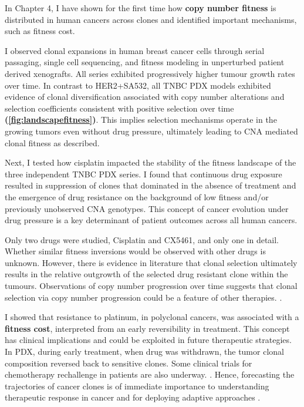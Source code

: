 In Chapter 4, I have shown for the first time how \textbf{copy number fitness} is distributed in human cancers across clones and identified important mechanisms, such as fitness cost. 

I observed clonal expansions in human breast cancer cells through serial passaging, single cell sequencing, and fitness modeling in unperturbed patient derived xenografts. 
All series exhibited progressively higher tumour growth rates over time. In contrast to HER2+SA532, all TNBC PDX models exhibited evidence of clonal diversification associated with copy number alterations and selection coefficients consistent with positive selection over time \textbf{(\autoref{fig:landscapefitness})}. This implies selection mechanisms operate in the growing tumors even without drug pressure, ultimately leading to CNA mediated clonal fitness as described. 

Next, I tested how cisplatin impacted the stability of the fitness landscape of the three independent TNBC PDX series. 
I found that continuous drug exposure resulted in suppression of clones that dominated in the absence of treatment and the emergence of drug resistance on the background of low fitness and/or previously unobserved CNA genotypes. This concept of cancer evolution under drug pressure is a key determinant of patient outcomes across all human cancers. 
 
Only two drugs were studied, Cisplatin and CX5461, and only one in detail. Whether similar fitness inversions would be observed with other drugs is unknown.  
However, there is evidence in literature that clonal selection ultimately results in the relative outgrowth of the selected drug resistant clone within the tumours. Observations of copy number progression over time suggests that clonal selection via copy number progression could be a feature of other therapies. \cite{aparicio2013implications, graham2017measuring, wu2012clonal, liu2009copy}. 

I showed that resistance to platinum, in polyclonal cancers, was associated with a \textbf{fitness cost}, interpreted from an early reversibility in treatment. This concept has clinical implications and could be exploited in future therapeutic strategies. In PDX, during early treatment, when drug was withdrawn, the tumor clonal composition reversed back to sensitive clones. Some clinical trials for chemotherapy rechallenge in patients are also underway. \cite{neuzillet2016platinum, cremolini2019rechallenge}.
Hence, forecasting the trajectories of cancer clones is of immediate importance to understanding therapeutic response in cancer and for deploying adaptive approaches \cite{Vasan2019-mt}.

